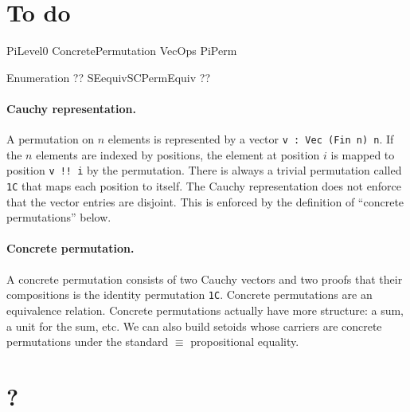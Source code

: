 \documentclass{article}
\begin{document}
\section{To do}

PiLevel0
ConcretePermutation
VecOps
PiPerm

Enumeration ??
SEequivSCPermEquiv ??


\paragraph*{Cauchy representation.} A permutation on $n$ elements is represented by a vector \texttt{v : Vec (Fin n) n}. If the $n$ elements are indexed by positions, the element at position $i$ is mapped to position \texttt{v !! i} by the permutation. There is always a trivial permutation called \texttt{1C} that maps each position to itself. The Cauchy representation does not enforce that the vector entries are disjoint. This is enforced by the definition of ``concrete permutations'' below. 

\paragraph*{Concrete permutation.} A concrete permutation consists of two Cauchy vectors and two proofs that their compositions is the identity permutation \texttt{1C}. Concrete permutations are an equivalence relation. Concrete permutations actually have more structure: a sum, a unit for the sum, etc. We can also build setoids whose carriers are concrete permutations under the standard $\equiv$ propositional equality.

\section{?}


\end{document}
